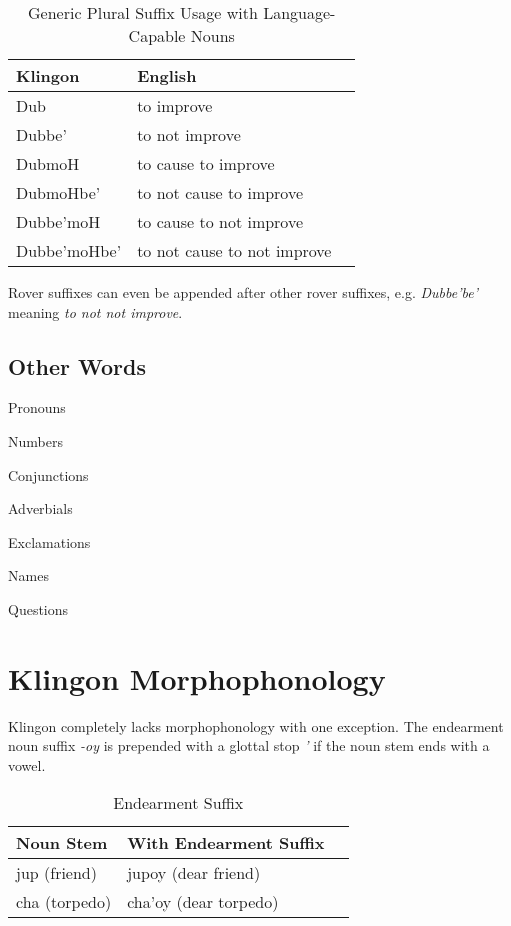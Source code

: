 \documentclass[11pt]{article}
\begin{document}
	\begin{table}[h]
	\begin{center}
	\begin{tabular}{lll}
	\toprule
	\bf Klingon & \bf English \\
	\midrule
	Dub & to improve \\
	Dubbe' & to not improve \\
	DubmoH & to cause to improve \\
	DubmoHbe' & to not cause to improve \\
	Dubbe'moH & to cause to not improve \\
	Dubbe'moHbe' & to not cause to not improve \\
	\bottomrule
	\end{tabular}
	\end{center}
	\caption{Generic Plural Suffix Usage with Language-Capable Nouns}
	\end{table}

Rover suffixes can even be appended after other rover suffixes, e.g. \textit{Dubbe'be'} meaning \textit{to not not improve}.

\subsection {Other Words}

Pronouns

Numbers

Conjunctions

Adverbials

Exclamations

Names

Questions

\section{Klingon Morphophonology}

Klingon completely lacks morphophonology with one exception. The endearment noun suffix \textit{-oy} is prepended with a glottal stop \textit{'} if the noun stem ends with a vowel.

	\begin{table}[h]
	\begin{center}
	\begin{tabular}{lll}
	\toprule
	\bf Noun Stem & \bf With Endearment Suffix \\
	\midrule
	jup (friend) & jupoy (dear friend) \\
	cha (torpedo) & cha'oy (dear torpedo) \\
	\bottomrule
	\end{tabular}
	\end{center}
	\caption{Endearment Suffix}
	\end{table}
\end{document}
